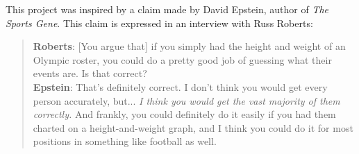 \documentclass[landscape, paperwidth=42in, paperheight=36in,
fontscale=.35, margin=1in]{baposter}
\begin{document}
\begin{poster}
{This project was inspired by a claim made by David Epstein, author of \textit{The Sports Gene}. This claim is expressed in an interview with Russ Roberts:
\begin{quote}
\footnotesize
\textbf{Roberts}: [You argue that] if you simply had the height and weight of an Olympic roster, you could do a pretty good job of guessing what their events are. Is that correct? \\
\textbf{Epstein}: That's definitely correct. I don't think you would get every person accurately, but... \textit{I think you would get the vast majority of them correctly.} And frankly, you could definitely do it easily if you had them charted on a height-and-weight graph, and I think you could do it for most positions in something like football as well.
\end{quote}

 }

\end{poster}
\end{document}
